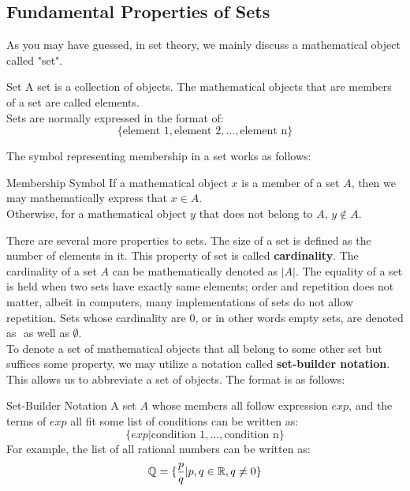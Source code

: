 \subsection{Fundamental Properties of Sets}
As you may have guessed, in set theory, we mainly discuss a mathematical object called "set".
\begin{ln-define}{Set}{}
    A set is a collection of objects. The mathematical objects that are members of a set are called elements. \\
    Sets are normally expressed in the format of:
    \[\{\text{element 1}, \text{element 2}, \dots, \text{element n}\}\]
\end{ln-define}
The symbol representing membership in a set works as follows:
\begin{ln-symbol}{Membership Symbol}{}
    If a mathematical object $x$ is a member of a set $A$, then we may mathematically express that $x \in A$. \\
    Otherwise, for a mathematical object $y$ that does not belong to $A$, $y \notin A$.
\end{ln-symbol}
There are several more properties to sets. The size of a set is defined as the number of elements in it. This property of set is called \textbf{cardinality}. The cardinality of a set $A$ can be mathematically denoted as $|A|$. The equality of a set is held when two sets have exactly same elements; order and repetition does not matter, albeit in computers, many implementations of sets do not allow repetition. Sets whose cardinality are 0, or in other words empty sets, are denoted as ${}$ as well as $\emptyset$. \\
To denote a set of mathematical objects that all belong to some other set but suffices some property, we may utilize a notation called \textbf{set-builder notation}. This allows us to abbreviate a set of objects. The format is as follows:
\begin{ln-symbol}{Set-Builder Notation}{}
    A set $A$ whose members all follow expression $exp$, and the terms of $exp$ all fit some list of conditions can be written as:
    \[\{exp | \text{condition 1}, \dots, \text{condition n}\}\]
    \tcblower
    For example, the list of all rational numbers can be written as:
    \[\mathbb{Q} = \{\frac{p}{q} | p,q \in \mathbb{R}, q \neq 0\}\]
\end{ln-symbol}

